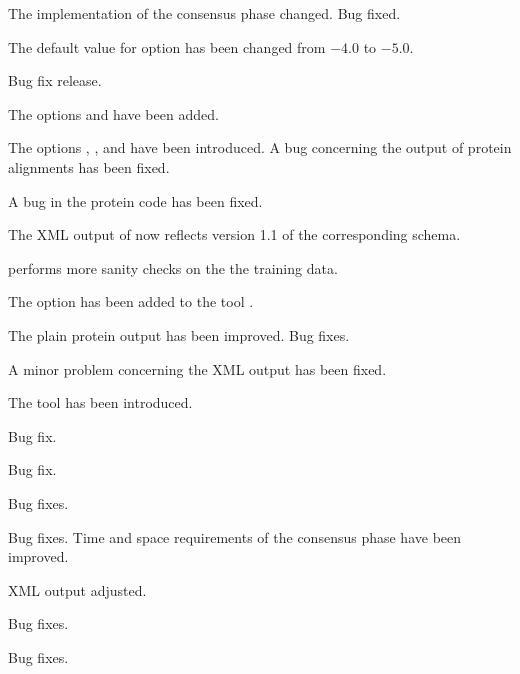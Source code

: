 \documentclass[11pt,a4paper,titlepage]{article}
\begin{document}
The implementation of the consensus phase changed. Bug fixed.

The default value for option  has been changed from $-4.0$
to $-5.0$.

Bug fix release.

The options  and  have been added.

The options , , and
 have been introduced. A bug concerning the output of
protein alignments has been fixed.

A bug in the protein code has been fixed.

The XML output of \Gth now reflects version 1.1 of the corresponding schema.

\Callgthbssmbuild performs more sanity checks on the the training data.

The option  has been added to the tool \Callgthbssmbuild.

 The plain protein output has been improved. Bug fixes.

 A minor problem concerning the XML output has been fixed.

 The tool \Callgthbssmbuild has been introduced.

 Bug fix.

 Bug fix.

 Bug fixes.

 Bug fixes. Time and space requirements of the consensus phase have been improved.

 XML output adjusted.

 Bug fixes.

 Bug fixes.
\end{document}
